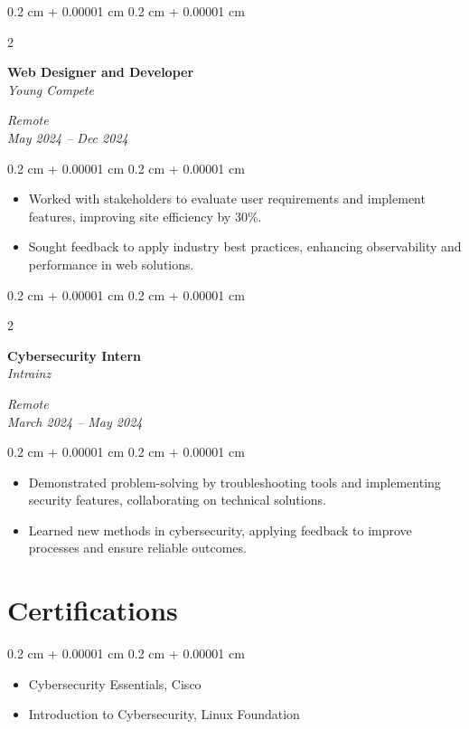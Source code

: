 \documentclass[10pt, letterpaper]{article}
\newenvironment{highlights}{
    \begin{itemize}[
        topsep=0.10 cm,
        parsep=0.10 cm,
        partopsep=0pt,
        itemsep=0pt,
        leftmargin=0.4 cm + 10pt
    ]
}{
    \end{itemize}
} %
\newenvironment{onecolentry}{
    \begin{adjustwidth}{
        0.2 cm + 0.00001 cm
    }{
        0.2 cm + 0.00001 cm
    }
}{
    \end{adjustwidth}
} %
\newenvironment{twocolentry}[2][]{
    \onecolentry
    \def\secondColumn{#2}
    \setcolumnwidth{\fill, 4.5 cm}
    \begin{paracol}{2}
}{
    \switchcolumn \raggedleft \secondColumn
    \end{paracol}
    \endonecolentry
} %
\begin{document}
    \vspace{0.2 cm}
    \begin{twocolentry}{
        \textit{Remote} \\
        \textit{May 2024 – Dec 2024}
    }
        \textbf{Web Designer and Developer} \\
        \textit{Young Compete}
    \end{twocolentry}
    \vspace{0.10 cm}
    \begin{onecolentry}
        \begin{highlights}
            \item Worked with stakeholders to evaluate user requirements and implement features, improving site efficiency by 30\%.
            \item Sought feedback to apply industry best practices, enhancing observability and performance in web solutions.
        \end{highlights}
    \end{onecolentry}

    \vspace{0.2 cm}
    \begin{twocolentry}{
        \textit{Remote} \\
        \textit{March 2024 – May 2024}
    }
        \textbf{Cybersecurity Intern} \\
        \textit{Intrainz}
    \end{twocolentry}
    \vspace{0.10 cm}
    \begin{onecolentry}
        \begin{highlights}
            \item Demonstrated problem-solving by troubleshooting tools and implementing security features, collaborating on technical solutions.
            \item Learned new methods in cybersecurity, applying feedback to improve processes and ensure reliable outcomes.
        \end{highlights}
    \end{onecolentry}

    \section{Certifications}
    \begin{onecolentry}
        \begin{highlights}
            \item Cybersecurity Essentials, Cisco
            \item Introduction to Cybersecurity, Linux Foundation
        \end{highlights}
    \end{onecolentry}
\end{document}

